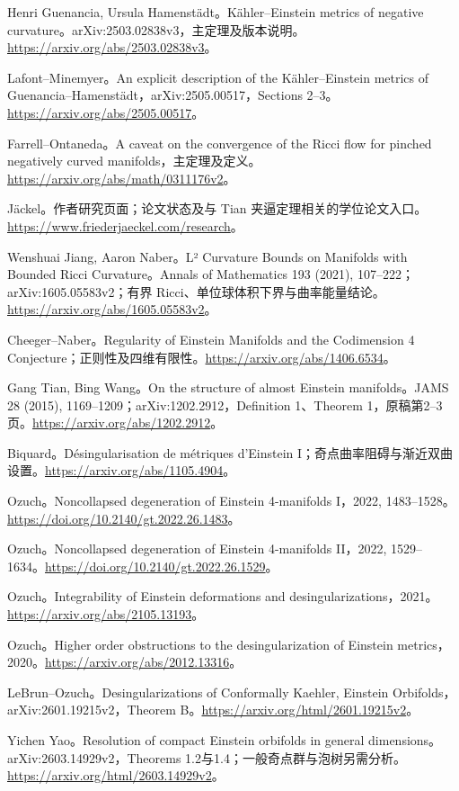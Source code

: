 \documentclass[11pt,a4paper]{article}
\theoremstyle{definition}
\begin{document}
\begin{enumerate}[label={[\arabic*]},leftmargin=2.2em,itemsep=0.55em]
\item Henri Guenancia, Ursula Hamenstädt。Kähler--Einstein metrics of negative curvature。arXiv:2503.02838v3，主定理及版本说明。\url{https://arxiv.org/abs/2503.02838v3}。
\item Lafont--Minemyer。An explicit description of the Kähler--Einstein metrics of Guenancia--Hamenstädt，arXiv:2505.00517，Sections 2--3。\url{https://arxiv.org/abs/2505.00517}。
\item Farrell--Ontaneda。A caveat on the convergence of the Ricci flow for pinched negatively curved manifolds，主定理及定义。\url{https://arxiv.org/abs/math/0311176v2}。
\item Jäckel。作者研究页面；论文状态及与 Tian 夹逼定理相关的学位论文入口。\url{https://www.friederjaeckel.com/research}。
\item Wenshuai Jiang, Aaron Naber。L² Curvature Bounds on Manifolds with Bounded Ricci Curvature。Annals of Mathematics 193 (2021), 107--222；arXiv:1605.05583v2；有界 Ricci、单位球体积下界与曲率能量结论。\url{https://arxiv.org/abs/1605.05583v2}。
\item Cheeger--Naber。Regularity of Einstein Manifolds and the Codimension 4 Conjecture；正则性及四维有限性。\url{https://arxiv.org/abs/1406.6534}。
\item Gang Tian, Bing Wang。On the structure of almost Einstein manifolds。JAMS 28 (2015), 1169--1209；arXiv:1202.2912，Definition 1、Theorem 1，原稿第2--3页。\url{https://arxiv.org/abs/1202.2912}。
\item Biquard。Désingularisation de métriques d'Einstein I；奇点曲率阻碍与渐近双曲设置。\url{https://arxiv.org/abs/1105.4904}。
\item Ozuch。Noncollapsed degeneration of Einstein 4-manifolds I，2022, 1483--1528。\url{https://doi.org/10.2140/gt.2022.26.1483}。
\item Ozuch。Noncollapsed degeneration of Einstein 4-manifolds II，2022, 1529--1634。\url{https://doi.org/10.2140/gt.2022.26.1529}。
\item Ozuch。Integrability of Einstein deformations and desingularizations，2021。\url{https://arxiv.org/abs/2105.13193}。
\item Ozuch。Higher order obstructions to the desingularization of Einstein metrics，2020。\url{https://arxiv.org/abs/2012.13316}。
\item LeBrun--Ozuch。Desingularizations of Conformally Kaehler, Einstein Orbifolds，arXiv:2601.19215v2，Theorem B。\url{https://arxiv.org/html/2601.19215v2}。
\item Yichen Yao。Resolution of compact Einstein orbifolds in general dimensions。arXiv:2603.14929v2，Theorems 1.2与1.4；一般奇点群与泡树另需分析。\url{https://arxiv.org/html/2603.14929v2}。

\end{enumerate}
\end{document}
